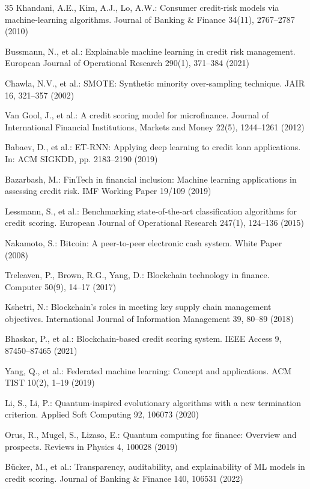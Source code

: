 \documentclass[preprint,12pt,authoryear]{elsarticle}
\begin{document}
\begin{thebibliography}{35}
Khandani, A.E., Kim, A.J., Lo, A.W.: Consumer credit-risk models via machine-learning algorithms. Journal of Banking \& Finance 34(11), 2767--2787 (2010)

Bussmann, N., et al.: Explainable machine learning in credit risk management. European Journal of Operational Research 290(1), 371--384 (2021)

Chawla, N.V., et al.: SMOTE: Synthetic minority over-sampling technique. JAIR 16, 321--357 (2002)

Van Gool, J., et al.: A credit scoring model for microfinance. Journal of International Financial Institutions, Markets and Money 22(5), 1244--1261 (2012)

Babaev, D., et al.: ET-RNN: Applying deep learning to credit loan applications. In: ACM SIGKDD, pp. 2183--2190 (2019)

Bazarbash, M.: FinTech in financial inclusion: Machine learning applications in assessing credit risk. IMF Working Paper 19/109 (2019)

Lessmann, S., et al.: Benchmarking state-of-the-art classification algorithms for credit scoring. European Journal of Operational Research 247(1), 124--136 (2015)

Nakamoto, S.: Bitcoin: A peer-to-peer electronic cash system. White Paper (2008)

Treleaven, P., Brown, R.G., Yang, D.: Blockchain technology in finance. Computer 50(9), 14--17 (2017)

Kshetri, N.: Blockchain's roles in meeting key supply chain management objectives. International Journal of Information Management 39, 80--89 (2018)

Bhaskar, P., et al.: Blockchain-based credit scoring system. IEEE Access 9, 87450--87465 (2021)

Yang, Q., et al.: Federated machine learning: Concept and applications. ACM TIST 10(2), 1--19 (2019)

Li, S., Li, P.: Quantum-inspired evolutionary algorithms with a new termination criterion. Applied Soft Computing 92, 106073 (2020)

Orus, R., Mugel, S., Lizaso, E.: Quantum computing for finance: Overview and prospects. Reviews in Physics 4, 100028 (2019)

B\"ucker, M., et al.: Transparency, auditability, and explainability of ML models in credit scoring. Journal of Banking \& Finance 140, 106531 (2022)

\end{thebibliography}
\end{document}
